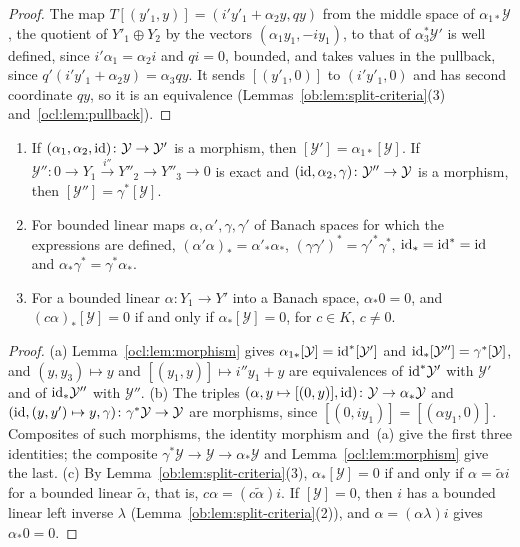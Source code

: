 \begin{proof}
The map $T[(y'_1,y)]=(i'y'_1+\alpha_2y,qy)$ from the middle space of $\alpha_{1*}\mathcal Y$, the quotient of
$Y'_1\oplus Y_2$ by the vectors $(\alpha_1y_1,-iy_1)$, to that of $\alpha_3^*\mathcal Y'$ is well defined, since
$i'\alpha_1=\alpha_2i$ and $qi=0$, bounded, and takes values in the pullback, since $q'(i'y'_1+\alpha_2y)=\alpha_3qy$. It
sends $[(y'_1,0)]$ to $(i'y'_1,0)$ and has second coordinate $qy$, so it is an equivalence
(Lemmas~\ref{ob:lem:split-criteria}(3) and~\ref{ocl:lem:pullback}).
\end{proof}

\begin{corollary}\label{ocl:cor:functorial}
\begin{enumerate}
\item[(a)] If $(\alpha_1,\alpha_2,\mathrm{id})\colon\mathcal Y\to\mathcal Y'$ is a morphism, then $[\mathcal
Y']=\alpha_{1*}[\mathcal Y]$. If $\mathcal Y''\colon0\to Y_1\xrightarrow{i''}Y''_2\to Y''_3\to0$ is exact and
$(\mathrm{id},\alpha_2,\gamma)\colon\mathcal Y''\to\mathcal Y$ is a morphism, then $[\mathcal Y'']=\gamma^*[\mathcal Y]$.
\item[(b)] For bounded linear maps $\alpha,\alpha',\gamma,\gamma'$ of Banach spaces for which the expressions are defined,
$(\alpha'\alpha)_*=\alpha'_*\alpha_*$, $(\gamma\gamma')^*=\gamma'^*\gamma^*$, $\mathrm{id}_*=\mathrm{id}^*=\mathrm{id}$ and
$\alpha_*\gamma^*=\gamma^*\alpha_*$.
\item[(c)] For a bounded linear $\alpha\colon Y_1\to Y'$ into a Banach space, $\alpha_*0=0$, and $(c\alpha)_*[\mathcal
Y]=0$ if and only if $\alpha_*[\mathcal Y]=0$, for $c\in K$, $c\ne0$.
\end{enumerate}
\end{corollary}

\begin{proof}
(a) Lemma~\ref{ocl:lem:morphism} gives $\alpha_{1*}[\mathcal Y]=\mathrm{id}^*[\mathcal Y']$ and $\mathrm{id}_*[\mathcal
Y'']=\gamma^*[\mathcal Y]$, and $(y,y_3)\mapsto y$ and $[(y_1,y)]\mapsto i''y_1+y$ are equivalences of $\mathrm{id}^*\mathcal
Y'$ with $\mathcal Y'$ and of $\mathrm{id}_*\mathcal Y''$ with $\mathcal Y''$. (b) The triples
$(\alpha,y\mapsto[(0,y)],\mathrm{id})\colon\mathcal Y\to\alpha_*\mathcal Y$ and $(\mathrm{id},(y,y')\mapsto
y,\gamma)\colon\gamma^*\mathcal Y\to\mathcal Y$ are morphisms, since $[(0,iy_1)]=[(\alpha y_1,0)]$. Composites of such
morphisms, the identity morphism and~(a) give the first three identities; the composite $\gamma^*\mathcal Y\to\mathcal
Y\to\alpha_*\mathcal Y$ and Lemma~\ref{ocl:lem:morphism} give the last. (c) By Lemma~\ref{ob:lem:split-criteria}(3),
$\alpha_*[\mathcal Y]=0$ if and only if $\alpha=\tilde\alpha i$ for a bounded linear $\tilde\alpha$, that is,
$c\alpha=(c\tilde\alpha)i$. If $[\mathcal Y]=0$, then $i$ has a bounded linear left inverse $\lambda$
(Lemma~\ref{ob:lem:split-criteria}(2)), and $\alpha=(\alpha\lambda)i$ gives $\alpha_*0=0$.
\end{proof}

